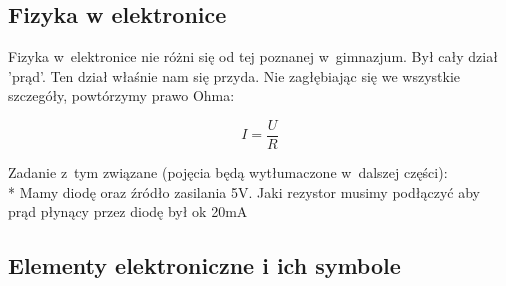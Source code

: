 \documentclass[a4paper,12pt, twoside]{article}
\begin{document}
 \subsection{Fizyka w elektronice}
	Fizyka w~elektronice nie różni się od tej poznanej w~gimnazjum. Był cały dział 'prąd'. Ten dział właśnie nam się przyda. Nie zagłębiając się we wszystkie szczegóły, powtórzymy prawo Ohma:
	\begin{center}
	\[
	I=\frac{U}{R}
	\]	
	\end{center}
Zadanie z~tym związane (pojęcia będą wytłumaczone w~dalszej części): \\* Mamy diodę oraz źródło zasilania 5V. Jaki rezystor musimy podłączyć aby prąd płynący przez diodę był ok 20mA %
	\subsection{Elementy elektroniczne i ich symbole}
\end{document}
